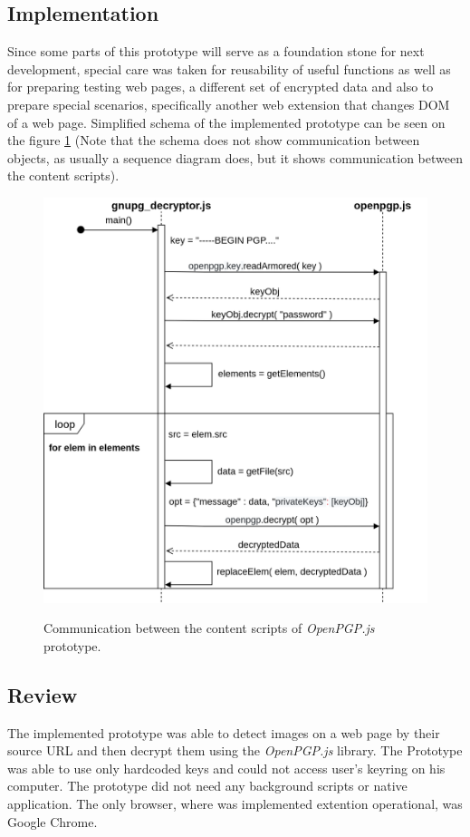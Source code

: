 \subsection{Implementation}
Since some parts of this prototype will serve as a foundation stone for next development, special care was taken for reusability of useful functions as well as for preparing testing web pages, a different set of encrypted data and also to prepare special scenarios, specifically another web extension that changes DOM of a web page. Simplified schema of the implemented prototype can be seen on the figure \ref{img:openpgp-sequence} (Note that the schema does not show communication between objects, as usually a sequence diagram does, but it shows communication between the content scripts).
\begin{figure}[H]
    \begin{center}
        \label{img:openpgp-sequence}
        \includegraphics[width=1.3\textwidth,angle=90]{obrazky-figures/openpgp-sequence.png}
        \caption{Communication between the content scripts of \textit{OpenPGP.js} prototype.}
    \end{center}
\end{figure}


\subsection{Review}
The implemented prototype was able to detect images on a web page by their source URL and then decrypt them using the \textit{OpenPGP.js} library. The Prototype was able to use only hardcoded keys and could not access user's keyring on his computer. The prototype did not need any background scripts or native application. The only browser, where was implemented extention operational, was Google Chrome.

